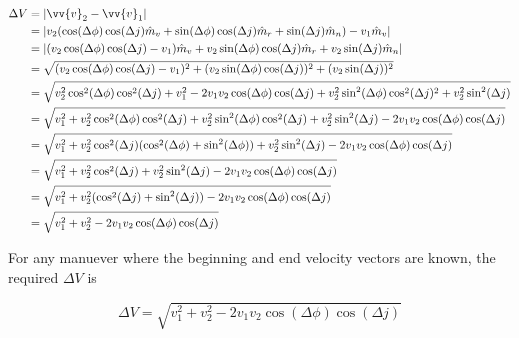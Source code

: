 \documentclass{article}
\begin{document}
\begin{align*}
    \Delta V & = |\vv{v}_2-\vv{v}_1|                                                                                                                                           \\
             & = |v_2(\cos(\Delta \phi)\cos(\Delta j)\hat{m}_v+\sin(\Delta \phi)\cos(\Delta j)\hat{m}_r+\sin(\Delta j)\hat{m}_n)-v_1\hat{m}_v|                                 \\
             & = |(v_2\cos(\Delta \phi)\cos(\Delta j)-v_1)\hat{m}_v+v_2\sin(\Delta \phi)\cos(\Delta j)\hat{m}_r+v_2\sin(\Delta j)\hat{m}_n|                                    \\
             & = \sqrt{(v_2\cos(\Delta \phi)\cos(\Delta j)-v_1)^2+(v_2\sin(\Delta \phi)\cos(\Delta j))^2+(v_2\sin(\Delta j))^2}                                                \\
             & = \sqrt{v_2^2\cos^2(\Delta \phi)\cos^2(\Delta j)+v_1^2-2v_1v_2\cos(\Delta \phi)\cos(\Delta j)+v_2^2\sin^2(\Delta \phi)\cos^2(\Delta j)^2+v_2^2\sin^2(\Delta j)} \\
             & = \sqrt{v_1^2+v_2^2\cos^2(\Delta \phi)\cos^2(\Delta j)+v_2^2\sin^2(\Delta \phi)\cos^2(\Delta j)+v_2^2\sin^2(\Delta j)-2v_1v_2\cos(\Delta \phi)\cos(\Delta j)}   \\
             & = \sqrt{v_1^2+v_2^2\cos^2(\Delta j)(\cos^2(\Delta \phi)+\sin^2(\Delta \phi))+v_2^2\sin^2(\Delta j)-2v_1v_2\cos(\Delta \phi)\cos(\Delta j)}                      \\
             & = \sqrt{v_1^2+v_2^2\cos^2(\Delta j)+v_2^2\sin^2(\Delta j)-2v_1v_2\cos(\Delta \phi)\cos(\Delta j)}                                                               \\
             & = \sqrt{v_1^2+v_2^2(\cos^2(\Delta j)+\sin^2(\Delta j))-2v_1v_2\cos(\Delta \phi)\cos(\Delta j)}                                                                  \\
             & = \sqrt{v_1^2+v_2^2-2v_1v_2\cos(\Delta \phi)\cos(\Delta j)}                                                                                                     \\
\end{align*}

For any manuever where the beginning and end velocity vectors are known, the required $\Delta V$ is

\begin{equation}
    \Delta V = \sqrt{v_1^2+v_2^2-2v_1v_2\cos(\Delta \phi)\cos(\Delta j)}
\end{equation}
\end{document}
